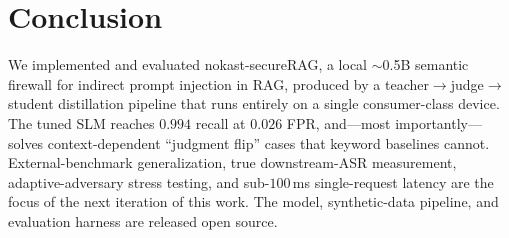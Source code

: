 \documentclass[11pt]{article}
\begin{document}
\section{Conclusion}
We implemented and evaluated nokast-secureRAG, a local $\sim$0.5B semantic firewall for
indirect prompt injection in RAG, produced by a teacher$\rightarrow$judge$\rightarrow$%
student distillation pipeline that runs entirely on a single consumer-class device.
The tuned SLM reaches $0.994$ recall at $0.026$ FPR, and---most
importantly---solves context-dependent ``judgment flip'' cases that keyword baselines
cannot. External-benchmark generalization, true downstream-ASR measurement,
adaptive-adversary stress testing, and sub-$100$\,ms single-request latency are the
focus of the next iteration of this work.
The model, synthetic-data pipeline, and evaluation harness are released open source.
\end{document}
